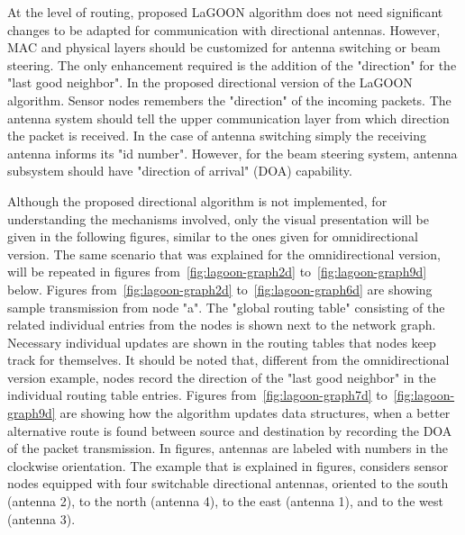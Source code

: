 \documentclass[12pt, oneandhalf, chaparabic, sees, ms]{metu}
\begin{document}
At the level of routing, proposed LaGOON algorithm does not need significant changes to be adapted for communication with directional antennas.
However, MAC and physical layers should be customized for antenna switching or beam steering.
The only enhancement required is the addition of the "direction" for the "last good neighbor".
In the proposed directional version of the LaGOON algorithm.
Sensor nodes remembers the "direction" of the incoming packets.
The antenna system should tell the upper communication layer from which direction the packet is received.
In the case of antenna switching simply the receiving antenna informs its "id number".
However, for the beam steering system, antenna subsystem should have "direction of arrival" (DOA) capability. 
 

Although the proposed directional algorithm is not implemented, for understanding the mechanisms involved, only the visual presentation will be given in the following figures, 
similar to the ones given for omnidirectional version. The same scenario that was explained for the omnidirectional version, will be repeated 
in figures from~\ref{fig:lagoon-graph2d} to~\ref{fig:lagoon-graph9d} below.
Figures from~\ref{fig:lagoon-graph2d} to~\ref{fig:lagoon-graph6d} are showing sample transmission from node "a". 
The "global routing table" consisting of the related individual entries from the nodes
is shown next to the network graph. Necessary individual updates are shown in the routing tables that nodes keep track for themselves. 
It should be noted that, different from the omnidirectional version example, nodes record the direction of the "last good neighbor" in the individual routing table entries. 
Figures from~\ref{fig:lagoon-graph7d} to~\ref{fig:lagoon-graph9d} are showing how the
algorithm updates data structures, when a better alternative route is found between source and destination by recording the DOA of the packet transmission. 
In figures, antennas are labeled with numbers in the clockwise orientation. The example that is explained in figures, considers sensor nodes equipped with 
four switchable directional antennas, oriented to the south (antenna 2), to the north (antenna 4), to the east (antenna 1), and to the west (antenna 3).



\end{document}
